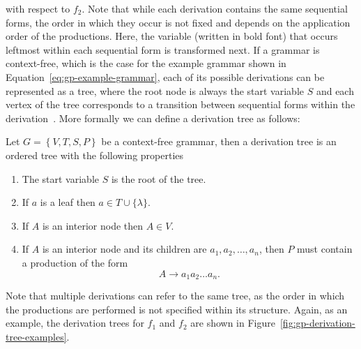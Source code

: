 with respect to $f_2$. 
Note that while each derivation contains the same sequential forms, the order in which they occur is not fixed and depends on the application order of the productions.
Here, the variable (written in bold font) that occurs leftmost within each sequential form is transformed next.
If a grammar is context-free, which is the case for the example grammar shown in Equation~\ref{eq:gp-example-grammar}, each of its possible derivations can be represented as a tree, where the root node is always the start variable $S$ and each vertex of the tree corresponds to a transition between sequential forms within the derivation~\cite{linz2006introduction}.
More formally we can define a derivation tree as follows:
\begin{definition}\label{def:derivation-tree}
	Let $G = \left\{V, T, S, P\right\}$ be a context-free grammar, then a derivation tree is an ordered tree with the following properties
	\begin{enumerate}
		\item The start variable $S$ is the root of the tree.
		\item If $a$ is a leaf then $a \in T \cup \{\lambda \}$.
		\item If $A$ is an interior node then $A \in V$.
		\item If $A$ is an interior node and its children are $a_1, a_2, \dots, a_n$, then $P$ must contain a production of the form
		\begin{equation}
			A \to a_1 a_2 \dots a_n.
		\end{equation}  
	\end{enumerate}
\end{definition}
Note that multiple derivations can refer to the same tree, as the order in which the productions are performed is not specified within its structure.
Again, as an example, the derivation trees for $f_1$ and $f_2$ are shown in Figure~\ref{fig:gp-derivation-tree-examples}.
